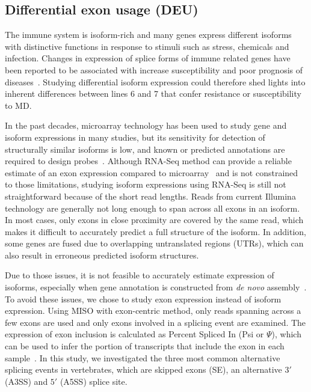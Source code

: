 \documentclass[10pt]{article}
\begin{document}
\subsection*{Differential exon usage (DEU)}

The immune system is isoform-rich and many genes express different isoforms with
distinctive functions in response to stimuli such as stress, chemicals and infection.
Changes in expression of splice forms of immune related genes have been reported to
be associated with increase susceptibility and poor prognosis of diseases~\cite{lynch2004consequences}.
Studying differential isoform expression could therefore shed lights into inherent differences between 
lines 6 and 7 that confer resistance or susceptibility to MD.

In the past decades, microarray technology has been used to study gene and isoform
expressions in many studies, but its sensitivity for detection of structurally similar
isoforms is low, and known or predicted annotations are required to design probes~\cite{kane2000assessment}.
Although RNA-Seq method can provide a reliable estimate of an exon expression compared
to microarray~\cite{pan2008deep} and is not constrained to those limitations, studying isoform
expressions using RNA-Seq is still not straightforward because of the short read lengths.
Reads from current Illumina technology are generally not long enough to span across all exons in an isoform.
In most cases, only exons in close proximity are covered by the same read, which makes it
difficult to accurately predict a full structure of the isoform.
In addition, some genes are fused due to overlapping untranslated regions (UTRs),
which can also result in erroneous predicted isoform structures.

Due to those issues, it is not feasible to accurately estimate expression of isoforms, especially when
gene annotation is constructed from \textit{de novo} assembly~\cite{trapnell2013differential}.
To avoid these issues, we chose to study exon expression instead of isoform expression.
Using MISO with exon-centric method, only reads spanning across a few exons are used and only exons
involved in a splicing event are examined.
The expression of exon inclusion is calculated as Percent Spliced In (Psi or $\Psi$), which can be used to
infer the portion of transcripts that include the exon in each sample~\cite{Katz:2010iv}.
In this study, we investigated the three most common alternative splicing events in
vertebrates, which are skipped exons (SE), an alternative $3\prime$ (A3SS) and $5\prime$ (A5SS) splice site.
\end{document}
